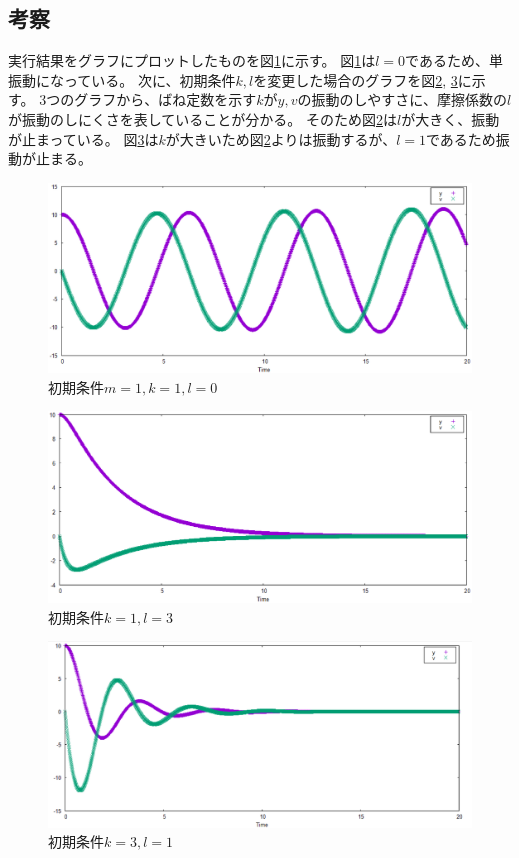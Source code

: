 \documentclass[a4j,titlepage]{jsarticle}
\begin{document}
\subsection{考察}
実行結果をグラフにプロットしたものを図\ref{101837_6Jan19}に示す。
図\ref{101837_6Jan19}は$l=0$であるため、単振動になっている。
次に、初期条件$k, l$を変更した場合のグラフを図\ref{mkl113}, \ref{mkl131}に示す。
3つのグラフから、ばね定数を示す$k$が$y, v$の振動のしやすさに、摩擦係数の$l$が振動のしにくさを表していることが分かる。
そのため図\ref{mkl113}は$l$が大きく、振動が止まっている。
図\ref{mkl131}は$k$が大きいため図\ref{mkl113}よりは振動するが、$l=1$であるため振動が止まる。

\begin{figure}[H]
\centering
\includegraphics[scale=0.5]{./img/kadai6_1mkl_110.eps}
\caption{初期条件$m=1,k=1,l=0$}
\label{101837_6Jan19}
\end{figure}

\begin{figure}[H]
\centering
\includegraphics[scale=0.5]{./img/kadai6_2mkl_113.eps}
\caption{初期条件$k=1,l=3$}
\label{mkl113}
\end{figure}

\begin{figure}[H]
\centering
\includegraphics[scale=0.5]{./img/kadai6_3mkl_131.eps}
\caption{初期条件$k=3,l=1$}
\label{mkl131}
\end{figure}
\end{document}

